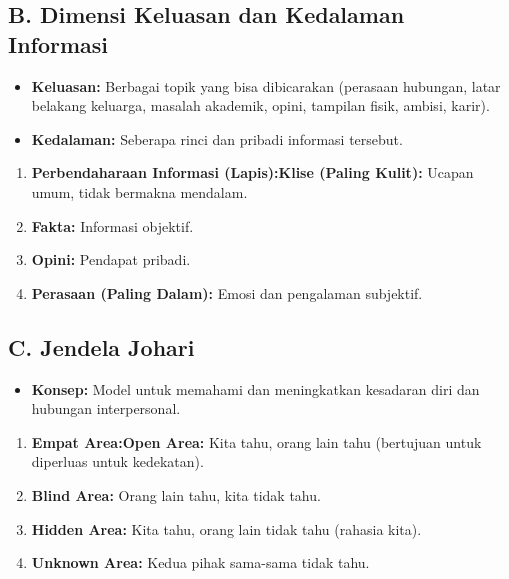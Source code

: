 \documentclass[
  letterpaper,
  DIV=11,
  numbers=noendperiod]{scrreprt}
\providecommand{\tightlist}{%
  \setlength{\itemsep}{0pt}\setlength{\parskip}{0pt}}
\begin{document}
\subsection{B. Dimensi Keluasan dan Kedalaman
Informasi}\label{b.-dimensi-keluasan-dan-kedalaman-informasi}

\begin{itemize}
\tightlist
\item
  \textbf{Keluasan:} Berbagai topik yang bisa dibicarakan (perasaan
  hubungan, latar belakang keluarga, masalah akademik, opini, tampilan
  fisik, ambisi, karir).
\item
  \textbf{Kedalaman:} Seberapa rinci dan pribadi informasi tersebut.
\end{itemize}

\begin{enumerate}
\def\labelenumi{\arabic{enumi}.}
\tightlist
\item
  \textbf{Perbendaharaan Informasi (Lapis):Klise (Paling Kulit):} Ucapan
  umum, tidak bermakna mendalam.
\item
  \textbf{Fakta:} Informasi objektif.
\item
  \textbf{Opini:} Pendapat pribadi.
\item
  \textbf{Perasaan (Paling Dalam):} Emosi dan pengalaman subjektif.
\end{enumerate}

\subsection{C. Jendela Johari}\label{c.-jendela-johari}

\begin{itemize}
\tightlist
\item
  \textbf{Konsep:} Model untuk memahami dan meningkatkan kesadaran diri
  dan hubungan interpersonal.
\end{itemize}

\begin{enumerate}
\def\labelenumi{\arabic{enumi}.}
\tightlist
\item
  \textbf{Empat Area:Open Area:} Kita tahu, orang lain tahu (bertujuan
  untuk diperluas untuk kedekatan).
\item
  \textbf{Blind Area:} Orang lain tahu, kita tidak tahu.
\item
  \textbf{Hidden Area:} Kita tahu, orang lain tidak tahu (rahasia kita).
\item
  \textbf{Unknown Area:} Kedua pihak sama-sama tidak tahu.
\end{enumerate}
\end{document}
